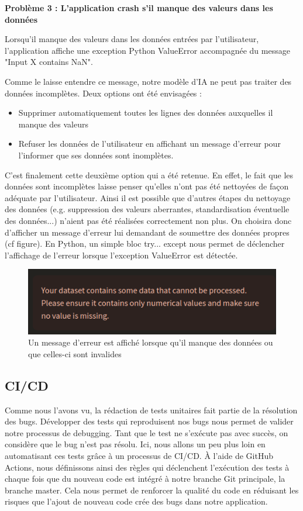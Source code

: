 \documentclass[french]{article}
\begin{document}
    \textbf{Problème 3 : L'application crash s'il manque des valeurs dans les données}

    Lorsqu'il manque des valeurs dans les données entrées par l'utilisateur, l'application affiche une exception Python ValueError accompagnée du message "Input X contains NaN".

    Comme le laisse entendre ce message, notre modèle d'IA ne peut pas traiter des données incomplètes. Deux options ont été envisagées :
    \begin{itemize}
        \item Supprimer automatiquement toutes les lignes des données auxquelles il manque des valeurs
        \item Refuser les données de l'utilisateur en affichant un message d'erreur pour l'informer que ses données sont inomplètes.
    \end{itemize}
    C'est finalement cette deuxième option qui a été retenue. En effet, le fait que les données sont incomplètes laisse penser qu'elles n'ont pas été nettoyées de façon adéquate par l'utilisateur. Ainsi il est possible que d'autres étapes du nettoyage des données (e.g. suppression des valeurs aberrantes, standardisation éventuelle des données...) n'aient pas été réalisées correctement non plus. On choisira donc d'afficher un message d'erreur lui demandant de soumettre des données propres (cf figure). En Python, un simple bloc try... except nous permet de déclencher l'affichage de l'erreur lorsque l'exception ValueError est détectée.
    \begin{figure}[h]
        \includegraphics[width=12cm]{error_1}
        \centering
        \caption{Un message d'erreur est affiché lorsque qu'il manque des données ou que celles-ci sont invalides}
        \centering
    \end{figure}
    \subsection{CI/CD}
    Comme nous l'avons vu, la rédaction de tests unitaires fait partie de la résolution des bugs. Développer des tests qui reproduisent nos bugs nous permet de valider notre processus de debugging. Tant que le test ne s'exécute pas avec succès, on considère que le bug n'est pas résolu. Ici, nous allons un peu plus loin en automatisant ces tests grâce à un processus de CI/CD. À l'aide de GitHub Actions, nous définissons ainsi des règles qui déclenchent l'exécution des tests à chaque fois que du nouveau code est intégré à notre branche Git principale, la branche master. Cela nous permet de renforcer la qualité du code en réduisant les risques que l'ajout de nouveau code crée des bugs dans notre application.
\end{document}
